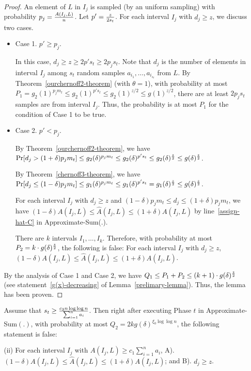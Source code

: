 \documentclass[runningheads]{llncs}
\newcommand{\prob}{{\rm Pr}}
\begin{document}
\begin{proof}
 An element of $L$ in $I_j$ is sampled (by an uniform sampling)
with probability $p_j={A(I_j,L)\over n}$. Let $p'={z\over 2s_t}$.
 For each interval $I_j$ with $d_j\ge z$, we discuss two
cases.

\begin{itemize}
\item
Case 1. $p'\ge p_j$.

In this case, $d_j\ge z\ge 2p' s_t\ge 2p_j s_t$. Note that $d_j$ is
the number of elements in interval $I_j$ among $s_t$ random samples
$a_{i_1},\ldots , a_{i_{s_t}}$ from $L$. By
Theorem~\ref{ourchernoff2-theorem} (with $\theta=1$), with
probability at most $P_1=g_2(1)^{p_jm_t}\le g_2(1)^{p's_t}\le
g_2(1)^{z/2}\le g(1)^{z/2}$, there are at least $2p_j s_t$ samples
are from interval $I_j$. Thus, the probability is at most $P_1$ for
the condition of Case 1 to be true.

\item
Case 2. $p'< p_j$.

 By
Theorem~\ref{ourchernoff2-theorem}, we have $\prob[d_j>
(1+\delta)p_jm_t]\le g_2(\delta)^{p_jm_t}\le g_2(\delta)^{p's_t}\le
g_2(\delta)^{z\over 2}\le g(\delta)^{z\over 2}$.



By Theorem~\ref{chernoff3-theorem}, we have $\prob[d_j\le
(1-\delta)p_jm_t]\le g_1(\delta)^ {p_jm_t}\le
g_1(\delta)^{p's_t}=g_1(\delta)^{z\over 2}\le g(\delta)^{z\over 2}$.


For each interval $I_j$ with $d_j\ge z$ and $(1-\delta)p_jm_t\le
d_j\le (1+\delta)p_jm_t$, we have $(1-\delta)A(I_j,L)\le
\hat{A}(I_j,L)\le (1+\delta)A(I_j,L)$ by line~\ref{assign-hat-C} in
Approximate-Sum(.).

There are $k$ intervals $I_1,\ldots , I_k$. Therefore, with
probability at most $P_2=k\cdot g(\delta)^{z\over 2}$,
 the following is false: For each interval $I_j$
with $d_j\ge z$, $(1-\delta)A(I_j,L)\le \hat{A}(I_j,L)\le
(1+\delta)A(I_j,L)$.
\end{itemize}

 By the
analysis of Case 1 and Case 2, we have  $Q_1\le P_1+P_2\le
(k+1)\cdot g(\delta)^{z\over 2}$ (see
statement~\ref{g(x)-decreasing} of Lemma~\ref{prelimary-lemma}).
Thus, the lemma has been proven.
\end{proof}




\begin{lemma}\label{lemma.2}
Assume that $s_t\ge{ c_2n\log\log n\over \sum_{i=1}^n a_i}$. Then
right after executing Phase $t$ in Approximate-Sum$(.)$, with
probability at most $Q_2=2kg(\delta)^{\xi_0\log\log n}$, the
following statement is false:

(ii) For each interval $I_j$ with $A(I_j, L)\ge c_1\sum_{i=1}^n
a_i$, A). $(1-\delta)A(I_j,L)\le \hat{A}(I_j,L)\le
(1+\delta)A(I_j,L)$; and B). $d_j\ge z$.
\end{lemma}
\end{document}
